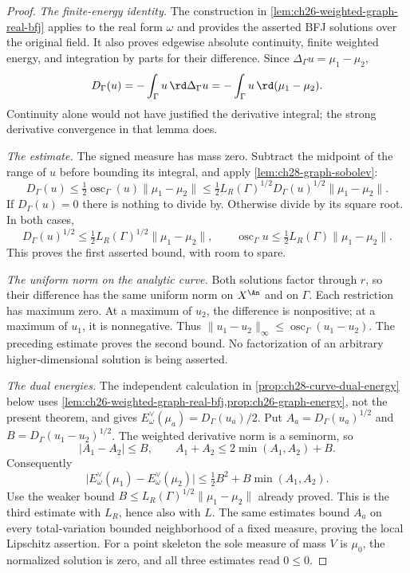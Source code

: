 \begin{proof}
\emph{The finite-energy identity.}
The construction in \cref{lem:ch26-weighted-graph-real-bfj} applies to
the real form \(\omega\) and provides the asserted BFJ solutions over
the original field.  It also proves edgewise absolute continuity,
finite weighted energy, and integration by parts for their difference.
Since \(\Delta_\Gamma u=\mu_1-\mu_2\),
\begin{equation}
\label{eq:ch28-stability-dirichlet-identity}
 D_\Gamma(u)=-\int_\Gamma u\,\rd\Delta_\Gamma u
            =-\int_\Gamma u\,\rd(\mu_1-\mu_2).
\end{equation}
Continuity alone would not have justified the derivative integral; the
strong derivative convergence in that lemma does.

\emph{The estimate.}
The signed measure has mass zero.  Subtract the midpoint of the range of
\(u\) before bounding its integral, and apply
\cref{lem:ch28-graph-sobolev}:
\[
 D_\Gamma(u)
 \leq\tfrac12\operatorname{osc}_\Gamma(u)\lVert\mu_1-\mu_2\rVert
 \leq\tfrac12 L_R(\Gamma)^{1/2}D_\Gamma(u)^{1/2}
                       \lVert\mu_1-\mu_2\rVert.
\]
If \(D_\Gamma(u)=0\) there is nothing to divide by.  Otherwise divide
by its square root.  In both cases,
\[
 D_\Gamma(u)^{1/2}
 \leq\tfrac12L_R(\Gamma)^{1/2}\lVert\mu_1-\mu_2\rVert,
 \qquad
 \operatorname{osc}_\Gamma u
 \leq\tfrac12L_R(\Gamma)\lVert\mu_1-\mu_2\rVert.
\]
This proves the first asserted bound, with room to spare.

\emph{The uniform norm on the analytic curve.}
Both solutions factor through \(r\), so their difference has the same
uniform norm on \(X^{\An}\) and on \(\Gamma\).  Each restriction has
maximum zero.  At a maximum of \(u_2\), the difference is nonpositive;
at a maximum of \(u_1\), it is nonnegative.  Thus
\(\lVert u_1-u_2\rVert_\infty\leq\operatorname{osc}_\Gamma(u_1-u_2)\).
The preceding estimate proves the second bound.  No factorization of
an arbitrary higher-dimensional solution is being asserted.

\emph{The dual energies.}
The independent calculation in \cref{prop:ch28-curve-dual-energy} below
uses \cref{lem:ch26-weighted-graph-real-bfj,prop:ch26-graph-energy}, not
the present theorem, and gives \(E^\vee_\omega(\mu_a)=D_\Gamma(u_a)/2\).
Put \(A_a=D_\Gamma(u_a)^{1/2}\) and \(B=D_\Gamma(u_1-u_2)^{1/2}\).
The weighted derivative norm is a seminorm, so
\[
 |A_1-A_2|\leq B,\qquad A_1+A_2\leq2\min(A_1,A_2)+B.
\]
Consequently
\[
 \bigl|E^\vee_\omega(\mu_1)-E^\vee_\omega(\mu_2)\bigr|
 \leq\tfrac12B^2+B\min(A_1,A_2).
\]
Use the weaker bound
\(B\leq L_R(\Gamma)^{1/2}\lVert\mu_1-\mu_2\rVert\) already proved.
This is the third estimate with \(L_R\), hence also with \(L\).
The same estimates bound \(A_a\) on every total-variation bounded
neighborhood of a fixed measure, proving the local Lipschitz assertion.
For a point skeleton the sole measure of mass \(V\) is \(\mu_0\),
the normalized solution is zero, and all three estimates read \(0\leq0\).
\end{proof}

